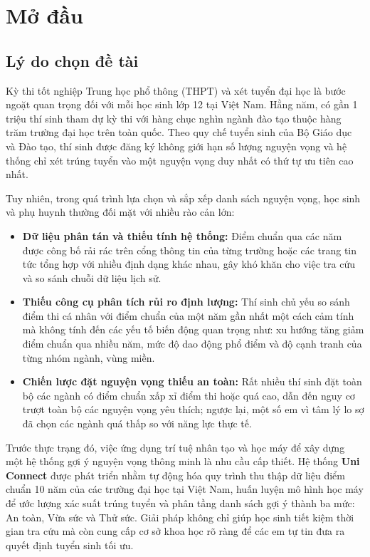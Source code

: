 \chapter{Mở đầu}
\label{ch:modau}

\section{Lý do chọn đề tài}

Kỳ thi tốt nghiệp Trung học phổ thông (THPT) và xét tuyển đại học là bước ngoặt quan trọng đối với mỗi học sinh lớp 12 tại Việt Nam. Hằng năm, có gần 1 triệu thí sinh tham dự kỳ thi với hàng chục nghìn ngành đào tạo thuộc hàng trăm trường đại học trên toàn quốc. Theo quy chế tuyển sinh của Bộ Giáo dục và Đào tạo, thí sinh được đăng ký không giới hạn số lượng nguyện vọng và hệ thống chỉ xét trúng tuyển vào một nguyện vọng duy nhất có thứ tự ưu tiên cao nhất.

Tuy nhiên, trong quá trình lựa chọn và sắp xếp danh sách nguyện vọng, học sinh và phụ huynh thường đối mặt với nhiều rào cản lớn:
\begin{itemize}[leftmargin=1.6em, itemsep=2pt]
  \item \textbf{Dữ liệu phân tán và thiếu tính hệ thống:} Điểm chuẩn qua các năm được công bố rải rác trên cổng thông tin của từng trường hoặc các trang tin tức tổng hợp với nhiều định dạng khác nhau, gây khó khăn cho việc tra cứu và so sánh chuỗi dữ liệu lịch sử.
  \item \textbf{Thiếu công cụ phân tích rủi ro định lượng:} Thí sinh chủ yếu so sánh điểm thi cá nhân với điểm chuẩn của một năm gần nhất một cách cảm tính mà không tính đến các yếu tố biến động quan trọng như: xu hướng tăng giảm điểm chuẩn qua nhiều năm, mức độ dao động phổ điểm và độ cạnh tranh của từng nhóm ngành, vùng miền.
  \item \textbf{Chiến lược đặt nguyện vọng thiếu an toàn:} Rất nhiều thí sinh đặt toàn bộ các ngành có điểm chuẩn xấp xỉ điểm thi hoặc quá cao, dẫn đến nguy cơ trượt toàn bộ các nguyện vọng yêu thích; ngược lại, một số em vì tâm lý lo sợ đã chọn các ngành quá thấp so với năng lực thực tế.
\end{itemize}

Trước thực trạng đó, việc ứng dụng trí tuệ nhân tạo và học máy để xây dựng một hệ thống gợi ý nguyện vọng thông minh là nhu cầu cấp thiết. Hệ thống \textbf{Uni Connect} được phát triển nhằm tự động hóa quy trình thu thập dữ liệu điểm chuẩn 10 năm của các trường đại học tại Việt Nam, huấn luyện mô hình học máy để ước lượng xác suất trúng tuyển và phân tầng danh sách gợi ý thành ba mức: An toàn, Vừa sức và Thử sức. Giải pháp không chỉ giúp học sinh tiết kiệm thời gian tra cứu mà còn cung cấp cơ sở khoa học rõ ràng để các em tự tin đưa ra quyết định tuyển sinh tối ưu.

